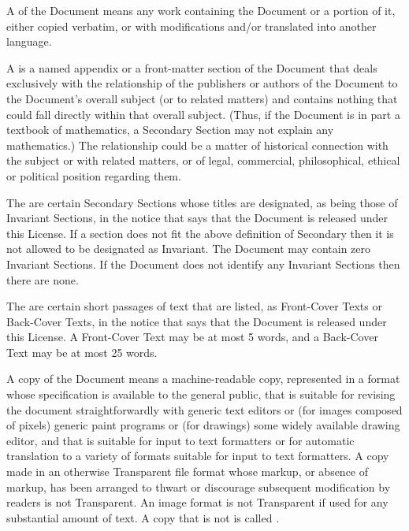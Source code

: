 A  of the Document means any work containing the
Document or a portion of it, either copied verbatim, or with
modifications and/or translated into another language.

A  is a named appendix or a front-matter section of
the Document that deals exclusively with the relationship of the
publishers or authors of the Document to the Document's overall subject
(or to related matters) and contains nothing that could fall directly
within that overall subject.  (Thus, if the Document is in part a
textbook of mathematics, a Secondary Section may not explain any
mathematics.)  The relationship could be a matter of historical
connection with the subject or with related matters, or of legal,
commercial, philosophical, ethical or political position regarding
them.

The  are certain Secondary Sections whose titles
are designated, as being those of Invariant Sections, in the notice
that says that the Document is released under this License.  If a
section does not fit the above definition of Secondary then it is not
allowed to be designated as Invariant.  The Document may contain zero
Invariant Sections.  If the Document does not identify any Invariant
Sections then there are none.

The  are certain short passages of text that are listed,
as Front-Cover Texts or Back-Cover Texts, in the notice that says that
the Document is released under this License.  A Front-Cover Text may
be at most 5 words, and a Back-Cover Text may be at most 25 words.

A  copy of the Document means a machine-readable copy,
represented in a format whose specification is available to the
general public, that is suitable for revising the document
straightforwardly with generic text editors or (for images composed of
pixels) generic paint programs or (for drawings) some widely available
drawing editor, and that is suitable for input to text formatters or
for automatic translation to a variety of formats suitable for input
to text formatters.  A copy made in an otherwise Transparent file
format whose markup, or absence of markup, has been arranged to thwart
or discourage subsequent modification by readers is not Transparent.
An image format is not Transparent if used for any substantial amount
of text.  A copy that is not  is called .


